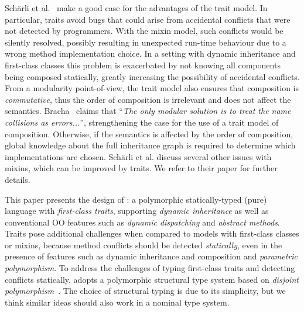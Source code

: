 Sch\"arli et al.~\citep{scharli2003traits} make a good case for the advantages of the trait
model. In particular, traits avoid bugs that could arise from
accidental conflicts that were not detected by programmers. With the
mixin model, such conflicts would be silently resolved, possibly
resulting in unexpected run-time behaviour due to a wrong method
implementation choice. In a setting with dynamic inheritance and
first-class classes this problem
is exacerbated by not knowing all components being composed
statically, greatly increasing the possibility of accidental
conflicts. From a modularity point-of-view,
the trait model also ensures that composition is \emph{commutative}, thus the order
of composition is irrelevant and does not affect the
semantics. Bracha~\citep{bracha1992programming} claims that ``\emph{The only modular
  solution is to treat the name collisions as errors...}'', strengthening the case for the use of a trait model of
composition. Otherwise, if the semantics is affected by the order of
composition, global knowledge about the full inheritance graph is
required to determine which implementations are chosen. 
Sch\"arli et al. discuss several other issues with mixins, which
can be improved by traits. We refer to their paper for further details.

This paper presents the design of \sedel: a polymorphic statically-typed
(pure) language with \emph{first-class traits}, supporting \emph{dynamic
  inheritance} as well as conventional OO features such as
\emph{dynamic dispatching} and \emph{abstract methods}.
Traits pose additional challenges when compared to
models with first-class classes or mixins, because method conflicts
should be detected \emph{statically}, even in the presence of features
such as dynamic inheritance and composition and \emph{parametric polymorphism}.
To address the challenges of typing first-class traits and detecting conflicts statically,
\sedel adopts a polymorphic structural type system based on
\emph{disjoint polymorphism}~\citep{alpuimdisjoint}.
The choice of structural typing is due to its simplicity, but we think
similar ideas should also work in a nominal type system.

